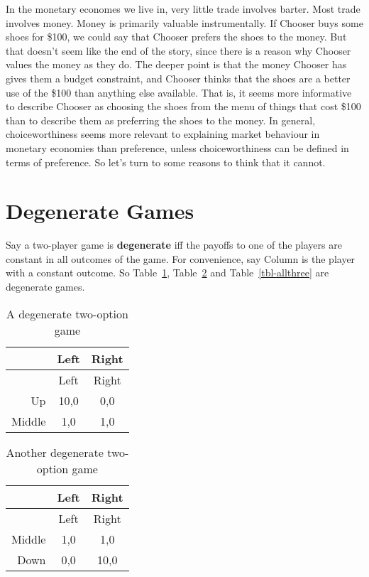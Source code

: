 \documentclass[
  11pt,
  letterpaper,
  DIV=11,
  numbers=noendperiod,
  twoside]{scrartcl}
\begin{document}
In the monetary economes we live in, very little trade involves barter.
Most trade involves money. Money is primarily valuable instrumentally.
If Chooser buys some shoes for \$100, we could say that Chooser prefers
the shoes to the money. But that doesn't seem like the end of the story,
since there is a reason why Chooser values the money as they do. The
deeper point is that the money Chooser has gives them a budget
constraint, and Chooser thinks that the shoes are a better use of the
\$100 than anything else available. That is, it seems more informative
to describe Chooser as choosing the shoes from the menu of things that
cost \$100 than to describe them as preferring the shoes to the money.
In general, choiceworthiness seems more relevant to explaining market
behaviour in monetary economies than preference, unless choiceworthiness
can be defined in terms of preference. So let's turn to some reasons to
think that it cannot.

\section{Degenerate Games}\label{sec-games}

Say a two-player game is \textbf{degenerate} iff the payoffs to one of
the players are constant in all outcomes of the game. For convenience,
say Column is the player with a constant outcome. So
Table~\ref{tbl-upmid}, Table~\ref{tbl-middown} and
Table~\ref{tbl-allthree} are degenerate games.

\begin{longtable}[]{@{}rcc@{}}
\caption{A degenerate two-option game}\label{tbl-upmid}\tabularnewline
\toprule\noalign{}
& Left & Right \\
\midrule\noalign{}
\endfirsthead
\toprule\noalign{}
& Left & Right \\
\midrule\noalign{}
\endhead
\bottomrule\noalign{}
\endlastfoot
Up & 10,0 & 0,0 \\
Middle & 1,0 & 1,0 \\
\end{longtable}

\begin{longtable}[]{@{}rcc@{}}
\caption{Another degenerate two-option
game}\label{tbl-middown}\tabularnewline
\toprule\noalign{}
& Left & Right \\
\midrule\noalign{}
\endfirsthead
\toprule\noalign{}
& Left & Right \\
\midrule\noalign{}
\endhead
\bottomrule\noalign{}
\endlastfoot
Middle & 1,0 & 1,0 \\
Down & 0,0 & 10,0 \\
\end{longtable}
\end{document}
